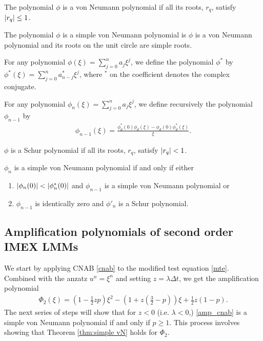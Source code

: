 \begin{definition}
        The polynomial $\phi$ is a von Neumann polynomial if all its roots, $r_q$, satisfy $\left|r_q\right|\leq 1$.
\end{definition}
\begin{definition}
	The polynomial $\phi$ is a simple von Neumann polynomial is $\phi$ is a von Neumann polynomial and its roots on the unit circle are simple roots.
\end{definition}
\begin{definition}
	For any polynomial $\phi(\xi) = \sum^n_{j=0} a_j\xi^j$, we define the polynomial $\phi^*$ by $\phi^*(\xi) = \sum^n_{j=0} a^*_{n-j} \xi^j$, where $^*$ on the coefficient denotes the complex conjugate.
\end{definition}
\begin{definition}
	For any polynomial $\phi_n(\xi) = \sum^n_{j=0} a_j\xi^j$, we define recursively the polynomial $\phi_{n-1}$ by
	\begin{align}
	\phi_{n-1}(\xi) = \frac{\phi_d^*(0)\phi_d(\xi) - \phi_d(0)\phi_d^*(\xi)}{\xi}.
	\end{align} 
\label{defn:recurse}
\end{definition}
\begin{definition}
	$\phi$ is a Schur polynomial if all its roots, $r_q$, satisfy $\left|r_q\right| < 1$.
\end{definition}
\begin{theorem}
	$\phi_n$ is a simple von Neumann polynomial if and only if either 
	\begin{enumerate}[label=(\alph{*})]
		\item $\left|\phi_n(0)\right| < \left|\phi^*_n(0)\right|$ and $\phi_{n-1}$ is a simple von Neumann polynomial or
		
		\item $\phi_{n-1}$ is identically zero and $\phi'_{n}$ is a Schur polynomial.
	\end{enumerate}
\label{thm:simple vN}
\end{theorem}

\subsection{Amplification polynomials of second order IMEX LMMs}
We start by applying CNAB \eqref{cnab} to the modified test equation \eqref{mte}. Combined with the anzatz $u^n = \xi^n$ and setting $z=\lambda\Delta t$, we get the amplification polynomial
\begin{align}
\Phi_2(\xi) 
= \left(1 - \frac{1}{2}zp\right)\xi^2
- \left(1 + z\left(\frac{3}{2}-p \right)\right)\xi + \frac{1}{2}z(1-p).
\label{amp_cnab}
\end{align}
The next series of steps will show that for $z<0$ (i.e. $\lambda < 0$,) \eqref{amp_cnab} is a simple von Neumann polynomial if and only if $p\geq 1$. This process involves showing that Theorem \ref{thm:simple vN} holds for $\Phi_2$.

